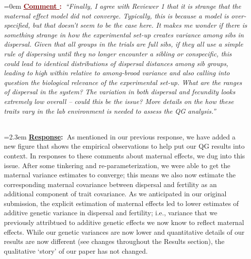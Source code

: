 \documentclass[12pt]{article}
\newcounter{cN}
\newcommand{\comment}[1]{
	\vspace{2em}
	\refstepcounter{cN} %
	\noindent \hangindent=0em \textbf{\textcolor{Maroon}{\uline{Comment \thecN}:~}}\emph{``#1''}
	}
\newcommand{\response}[1]{
	\\[0.25em]
	\hangindent=2.3em \textbf{\textcolor{NavyBlue}{\uline{Response}:~}}#1
	}
\begin{document}
\comment{Finally, I agree with Reviewer 1 that it is strange that the maternal effect model did not converge.
Typically, this is because a model is over-specified, but that doesn’t seem to be the case here.
It makes me wonder if there is something strange in how the experimental set-up creates variance among sibs in dispersal.
Given that all groups in the trials are full sibs, if they all use a simple rule of dispersing until they no longer encounter a sibling or conspecific, this could lead to identical distributions of dispersal distances among sib groups, leading to high within relative to among-brood variance and also calling into question the biological relevance of the experimental set-up.
What are the ranges of dispersal in the system? The variation in both dispersal and fecundity looks extremely low overall – could this be the issue?
More details on the how these traits vary in the lab environment is needed to assess the QG analysis.}
\response{As mentioned in our previous response, we have added a new figure that shows the empirical observations to help put our QG results into context.
In responses to these comments about maternal effects, we dug into this issue.
After some tinkering and re-parameterization, we were able to get the maternal variance estimates to converge; this means we also now estimate the corresponding maternal covariance between dispersal and fertility as an additional component of trait covariance. 
As we anticipated in our original submission, the explicit estimation of maternal effects led to lower estimates of additive genetic variance in dispersal and fertility; i.e., variance that we previously attribtued to additive genetic effects we now know to reflect maternal effects. 
While our genetic variances are now lower and quantitative details of our results are now different (see changes throughout the Results section), the qualitative `story' of our paper has not changed. 
}
\end{document}
